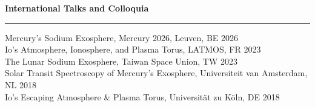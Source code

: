 \documentclass[12pt]{report}
\begin{document}
\vspace{2 mm}
\noindent\bf{International Talks and Colloquia}\rm \hspace*{\fill} \\
\rule{\textwidth}{1pt}
\noindent Mercury's Sodium Exosphere, Mercury 2026, Leuven, BE \hfill 2026\\
\noindent Io's Atmosphere, Ionosphere, and Plasma Torus, LATMOS, FR \hfill 2023\\
\noindent The Lunar Sodium Exosphere, Taiwan Space Union, TW \hfill 2023\\
\noindent Solar Transit Spectroscopy of Mercury's Exosphere, Universiteit van Amsterdam, NL \hfill 2018\\
\noindent Io's Escaping Atmosphere \& Plasma Torus, Universit\"at zu K\"oln, DE \hfill 2018\\
\end{document}
